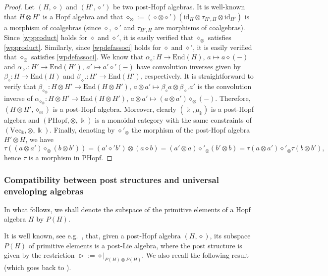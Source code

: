 \documentclass[10pt]{article}
\theoremstyle{definition}
\newcommand{\wt}{\vartriangleright}
\renewcommand{\wp}{\diamond}
\newcommand{\ot}{\otimes}
\begin{document}
\begin{proof}
Let $(H,\wp)$ and $(H',\wp')$ be two post-Hopf algebras. It is well-known that $H\ot H'$ is a Hopf algebra and that $\wp_{\ot}:=(\wp\ot\wp')(\mathrm{id}_{H}\ot\tau_{H',H}\ot\mathrm{id}_{H'})%
    $ is a morphism of coalgebras (since $\wp$, $\wp'$ and $\tau_{H',H}$ are morphisms of coalgebras). Since \eqref{wpproduct} holds for $\wp$ and $\wp'$, it is easily verified that $\wp_{\ot}$ satisfies \eqref{wpproduct}.
Similarly, since \eqref{wpdefassoci} holds for $\wp$ and $\wp'$, it is easily verified that $\wp_{\ot}$ satisfies \eqref{wpdefassoci}.
We know that $\alpha_{\wp}:H\to\mathrm{End}(H)$, $a\mapsto a\wp(-)$ and $\alpha_{\wp'}:H'\to\mathrm{End}(H')$, $a'\mapsto a'\wp'(-)$ have convolution inverses given by $\beta_{\wp}:H\to\mathrm{End}(H)$ and $\beta_{\wp'}:H'\to\mathrm{End}(H')$, respectively.
It is straightforward to verify that $\beta_{\wp_{\ot}}:H\ot H'\to\mathrm{End}(H\ot H')$, $a\ot a'\mapsto\beta_{\wp}a\ot\beta_{\wp'}a'$ is the convolution inverse of $\alpha_{\wp_{\ot}}:H\ot H'\to\mathrm{End}(H\ot H')$, $a\ot a'\mapsto (a\ot a')\wp_{\ot}(-)$.
Therefore, $(H\ot H',\wp_{\ot})$ is a post-Hopf algebra. Moreover, clearly $(\Bbbk,\mu_{\Bbbk})$ is a post-Hopf algebra and $(\mathrm{PHopf},\otimes,\Bbbk)$ is a monoidal category with the same constraints of $(\mathrm{Vec}_{\Bbbk},\ot,\Bbbk)$.
Finally, denoting by $\wp'_{\ot}$ the morphism of the post-Hopf algebra $H'\ot H$, we have
\[
\tau((a\ot a')\wp_{\ot}(b\ot b'))=%
(a'\wp' b')\ot(a\wp b)=(a'\ot a)\wp'_{\ot}(b'\ot b)=\tau(a\ot a')\wp'_{\ot}\tau(b\ot b'),
\]
hence $\tau$ is a morphism in $\mathrm{PHopf}$. 
\end{proof}


\subsubsection{Compatibility between post structures and universal enveloping algebras}
In what follows, we shall denote the subspace of the primitive elements of a Hopf algebra $H$ by $P(H)$. \medskip

It is well known, see e.g.\ \cite[Theorem 2.7]{LST}, that, given a post-Hopf algebra $(H,\wp)$, its subspace $P(H)$ of primitive elements is a post-Lie algebra, where the post structure is given by the restriction $\wt:=\wp|_{P(H)\ot P(H)}$. We also recall the following result (which goes back to \cite{ELM}).
\end{document}

